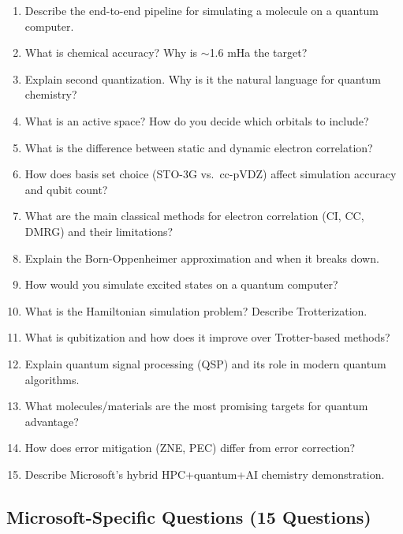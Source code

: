 \documentclass[11pt,a4paper]{article}
\begin{document}
\begin{questionbox}
\begin{enumerate}[label=\textbf{Q\arabic*.}, start=46]
    \item Describe the end-to-end pipeline for simulating a molecule on a quantum computer.
    \item What is chemical accuracy? Why is $\sim$1.6 mHa the target?
    \item Explain second quantization. Why is it the natural language for quantum chemistry?
    \item What is an active space? How do you decide which orbitals to include?
    \item What is the difference between static and dynamic electron correlation?
    \item How does basis set choice (STO-3G vs.\ cc-pVDZ) affect simulation accuracy and qubit count?
    \item What are the main classical methods for electron correlation (CI, CC, DMRG) and their limitations?
    \item Explain the Born-Oppenheimer approximation and when it breaks down.
    \item How would you simulate excited states on a quantum computer?
    \item What is the Hamiltonian simulation problem? Describe Trotterization.
    \item What is qubitization and how does it improve over Trotter-based methods?
    \item Explain quantum signal processing (QSP) and its role in modern quantum algorithms.
    \item What molecules/materials are the most promising targets for quantum advantage?
    \item How does error mitigation (ZNE, PEC) differ from error correction?
    \item Describe Microsoft's hybrid HPC+quantum+AI chemistry demonstration.
\end{enumerate}
\end{questionbox}

\subsection{Microsoft-Specific Questions (15 Questions)}
\end{document}
